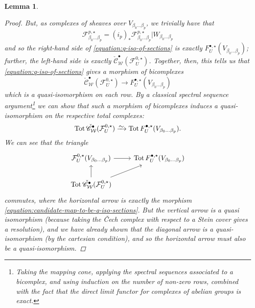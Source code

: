 \documentclass[11pt,fleqn]{article}
\theoremstyle{plain}
\newtheorem{lemma}[theorem]{Lemma}
\theoremstyle{definition}
\theoremstyle{remark}
\numberwithin{equation}{theorem}
\newcommand{\yetanothercover}{\mathcal{W}}
\newcommand{\anotherbullet}{\star}
\newcommand{\restricted}{\mathbin{\big\vert}}
\newcommand{\congto}{\xrightarrow{\raisebox{-.5ex}[0ex][0ex]{$\sim$}}}
\newcommand{\cech}{\check{\mathscr{C}}}
\DeclareMathOperator{\Tot}{Tot}
\begin{document}
\begin{lemma}
\begin{proof}
                But, as complexes of sheaves over $V_{\beta_0\ldots\beta_p}$, we trivially have that
                \[
                    \mathcal{F}_{\beta_0\ldots\beta_p}^{p,\anotherbullet}
                    =
                    (i_p)_* \mathcal{F}_{\beta_0\ldots\beta_p}^{p,\anotherbullet} \restricted W_{\beta_0\ldots\beta_p}
                \]
                and so the right-hand side of \cref{equation:q-iso-of-sections} is exactly $F_U^{\bullet,\anotherbullet}(V_{\beta_0\ldots\beta_p})$; further, the left-hand side is exactly $\cech_{\yetanothercover}^\bullet(\mathcal{F}_U^{0,\anotherbullet})$.
                Together, then, this tells us that \cref{equation:q-iso-of-sections} gives a morphism of bicomplexes
                \[
                    \cech_{\yetanothercover}^\bullet(\mathcal{F}_U^{0,\anotherbullet})
                    \to
                    F_U^{\bullet,\anotherbullet}(V_{\beta_0\ldots\beta_p})
                \]
                which is a quasi-isomorphism on each row.
                By a classical spectral sequence argument\footnote{Taking the mapping cone, applying the spectral sequences associated to a bicomplex, and using induction on the number of non-zero rows, combined with the fact that the direct limit functor for complexes of abelian groups is exact.} we can show that such a morphism of bicomplexes induces a quasi-isomorphism on the respective total complexes:
                \[
                    \Tot\cech_{\yetanothercover}^\bullet(\mathcal{F}_U^{0,\anotherbullet})
                    \congto
                    \Tot F_U^{\bullet,\anotherbullet}(V_{\beta_0\ldots\beta_p}).
                \]
                We can see that the triangle
                \[
                    \begin{tikzcd}
                        \mathcal{F}_U^{0,\anotherbullet}(V_{\beta_0\ldots\beta_p})
                            \ar[r]
                        & \Tot F_U^{\bullet,\anotherbullet}(V_{\beta_0\ldots\beta_p})
                    \\  \Tot\cech_{\yetanothercover}^\bullet(\mathcal{F}_U^{0,\anotherbullet})
                            \ar[u]
                            \ar[ur]
                    \end{tikzcd}
                \]
                commutes, where the horizontal arrow is exactly the morphism \cref{equation:candidate-map-to-be-q-iso-sections}.
                But the vertical arrow is a quasi isomorphism (because taking the Čech complex with respect to a Stein cover gives a resolution), and we have already shown that the diagonal arrow is a quasi-isomorphism (by the cartesian condition), and so the horizontal arrow must also be a quasi-isomorphism.
            \end{proof}
        \end{lemma}
\end{document}

